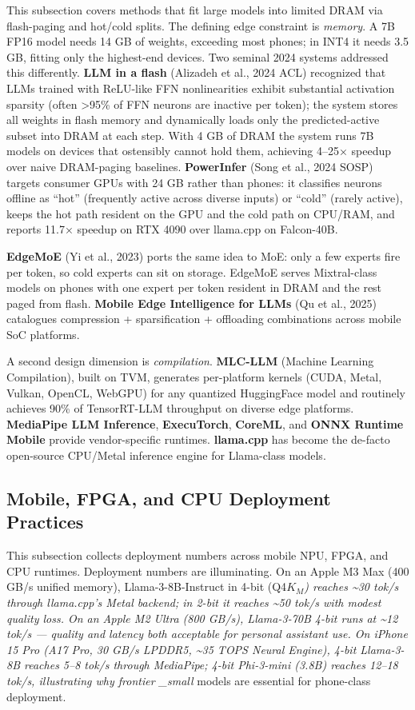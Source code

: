 This subsection covers methods that fit large models into limited DRAM via flash-paging and hot/cold splits. The defining edge constraint is \emph{memory}. A 7B FP16 model needs 14 GB of weights, exceeding most phones; in INT4 it needs 3.5 GB, fitting only the highest-end devices. Two seminal 2024 systems addressed this differently. \textbf{LLM in a flash} (Alizadeh et al., 2024 ACL) recognized that LLMs trained with ReLU-like FFN nonlinearities exhibit substantial activation sparsity (often \textgreater95\% of FFN neurons are inactive per token); the system stores all weights in flash memory and dynamically loads only the predicted-active subset into DRAM at each step. With 4 GB of DRAM the system runs 7B models on devices that ostensibly cannot hold them, achieving 4--25× speedup over naive DRAM-paging baselines. \textbf{PowerInfer} (Song et al., 2024 SOSP) targets consumer GPUs with 24 GB rather than phones: it classifies neurons offline as ``hot'' (frequently active across diverse inputs) or ``cold'' (rarely active), keeps the hot path resident on the GPU and the cold path on CPU/RAM, and reports 11.7× speedup on RTX 4090 over llama.cpp on Falcon-40B.

\textbf{EdgeMoE} (Yi et al., 2023) ports the same idea to MoE: only a few experts fire per token, so cold experts can sit on storage. EdgeMoE serves Mixtral-class models on phones with one expert per token resident in DRAM and the rest paged from flash. \textbf{Mobile Edge Intelligence for LLMs} (Qu et al., 2025) catalogues compression + sparsification + offloading combinations across mobile SoC platforms.

A second design dimension is \emph{compilation}. \textbf{MLC-LLM} (Machine Learning Compilation), built on TVM, generates per-platform kernels (CUDA, Metal, Vulkan, OpenCL, WebGPU) for any quantized HuggingFace model and routinely achieves 90\% of TensorRT-LLM throughput on diverse edge platforms. \textbf{MediaPipe LLM Inference}, \textbf{ExecuTorch}, \textbf{CoreML}, and \textbf{ONNX Runtime Mobile} provide vendor-specific runtimes. \textbf{llama.cpp} has become the de-facto open-source CPU/Metal inference engine for Llama-class models.

\subsection{Mobile, FPGA, and CPU Deployment Practices}\label{mobile-fpga-and-cpu-deployment-practices}

This subsection collects deployment numbers across mobile NPU, FPGA, and CPU runtimes. Deployment numbers are illuminating. On an Apple M3 Max (400 GB/s unified memory), Llama-3-8B-Instruct in 4-bit (Q4\emph{\(K_M\)) reaches \textasciitilde30 tok/s through llama.cpp's Metal backend; in 2-bit it reaches \textasciitilde50 tok/s with modest quality loss. On an Apple M2 Ultra (800 GB/s), Llama-3-70B 4-bit runs at \textasciitilde12 tok/s --- quality and latency both acceptable for personal assistant use. On iPhone 15 Pro (A17 Pro, 30 GB/s LPDDR5, \textasciitilde35 TOPS Neural Engine), 4-bit Llama-3-8B reaches 5--8 tok/s through MediaPipe; 4-bit Phi-3-mini (3.8B) reaches 12--18 tok/s, illustrating why frontier \_small} models are essential for phone-class deployment.

